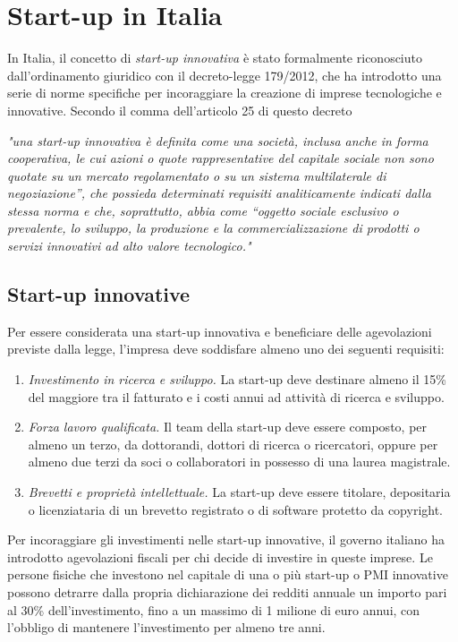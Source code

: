 \chapter{Start-up in Italia}
In Italia, il concetto di \textit{start-up innovativa} è stato formalmente riconosciuto dall’ordinamento giuridico con il decreto-legge 179/2012, che ha introdotto una serie di norme specifiche per incoraggiare la creazione di imprese tecnologiche e innovative. Secondo il comma dell’articolo 25 di questo decreto
\begin{center}
\textit{"una start-up innovativa è definita come una società, inclusa anche in forma cooperativa, le cui azioni o quote rappresentative del capitale sociale non sono quotate su un mercato regolamentato o su un sistema multilaterale di negoziazione”, che possieda determinati requisiti analiticamente indicati dalla stessa norma e che, soprattutto, abbia come “oggetto sociale esclusivo o prevalente, lo sviluppo, la produzione e la commercializzazione di prodotti o servizi innovativi ad alto valore tecnologico."}    
\end{center}

\section{Start-up innovative}
Per essere considerata una start-up innovativa e beneficiare delle agevolazioni previste dalla legge, l’impresa deve soddisfare almeno uno dei seguenti requisiti:
\begin{enumerate}
    \item \textit{Investimento in ricerca e sviluppo.} La start-up deve destinare almeno il 15\% del maggiore tra il fatturato e i costi annui ad attività di ricerca e sviluppo.
    \item \textit{Forza lavoro qualificata.} Il team della start-up deve essere composto, per almeno un terzo, da dottorandi, dottori di ricerca o ricercatori, oppure per almeno due terzi da soci o collaboratori in possesso di una laurea magistrale.
    \item \textit{Brevetti e proprietà intellettuale.} La start-up deve essere titolare, depositaria o licenziataria di un brevetto registrato o di software protetto da copyright.
\end{enumerate}
Per incoraggiare gli investimenti nelle start-up innovative, il governo italiano ha introdotto agevolazioni fiscali per chi decide di investire in queste imprese. Le persone fisiche che investono nel capitale di una o più start-up o PMI innovative possono detrarre dalla propria dichiarazione dei redditi annuale un importo pari al 30\% dell’investimento, fino a un massimo di 1 milione di euro annui, con l’obbligo di mantenere l’investimento per almeno tre anni.

